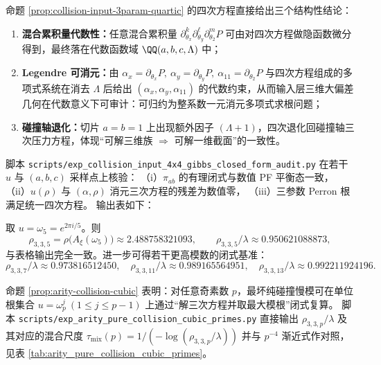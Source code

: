 \begin{remark}\label{rem:collision-input-3param-corollaries}
命题 \ref{prop:collision-input-3param-quartic} 的四次方程直接给出三个结构性结论：
\begin{enumerate}
  \item \textbf{混合累积量代数性：}任意混合累积量 \(\partial_{\theta_x}^{k}\partial_{\theta_y}^{\ell}\partial_{\theta_2}^{m}P\) 可由对四次方程做隐函数微分得到，最终落在代数函数域 \(\QQ(a,b,c,\Lambda)\) 中；
  \item \textbf{Legendre 可消元：}由 \(\alpha_x=\partial_{\theta_x}P,\ \alpha_y=\partial_{\theta_y}P,\ \alpha_{11}=\partial_{\theta_2}P\) 与四次方程组成的多项式系统在消去 \(\Lambda\) 后给出 \((\alpha_x,\alpha_y,\alpha_{11})\) 的代数约束，从而输入层三维大偏差几何在代数意义下可审计：可归约为整系数一元消元多项式求根问题；
  \item \textbf{碰撞轴退化：}切片 \(a=b=1\) 上出现额外因子 \((\Lambda+1)\)，四次退化回碰撞轴三次压力方程，体现“可解三维族 \(\Rightarrow\) 可解一维截面”的一致性。
\end{enumerate}
\end{remark}

\begin{remark}\label{rem:collision-input-4x4-gibbs-audit}
脚本 \texttt{scripts/exp\_collision\_input\_4x4\_gibbs\_closed\_form\_audit.py} 在若干 \(u\) 与 \((a,b,c)\) 采样点上核验：
（i）\(\pi_{ab}\) 的有理闭式与数值 PF 平衡态一致，
（ii）\(u(\rho)\) 与 \((\alpha,\rho)\) 消元三次方程的残差为数值零，
（iii）三参数 Perron 根满足统一四次方程。
输出表如下：

\end{remark}

\begin{remark}\label{cor:arity-335-rho-closed-form}
取 \(u=\omega_5=e^{2\pi i/5}\)。则
$$
\rho_{3,3,5}=\rho\bigl(A_\xi(\omega_5)\bigr)\approx 2.488758321093,
\qquad
\rho_{3,3,5}/\lambda\approx 0.950621088873,
$$
与表格输出完全一致。进一步可得若干更高模数的闭式基准：
$$
\rho_{3,3,7}/\lambda\approx 0.973816512450,\quad
\rho_{3,3,11}/\lambda\approx 0.989165564951,\quad
\rho_{3,3,13}/\lambda\approx 0.992211924196.
$$
\end{remark}

\begin{remark}\label{rem:arity-collision-cubic-primes-table}
命题 \ref{prop:arity-collision-cubic} 表明：对任意奇素数 \(p\)，最坏纯碰撞慢模可在单位根集合 \(u=\omega_p^j\ (1\le j\le p-1)\) 上通过“解三次方程并取最大模根”闭式复算。
脚本 \texttt{scripts/exp\_arity\_pure\_collision\_cubic\_primes.py} 直接输出
\(
\rho_{3,3,p}/\lambda
\)
及其对应的混合尺度
\(
\tau_{\mathrm{mix}}(p)=1/(-\log(\rho_{3,3,p}/\lambda))
\)
并与 \(p^{-4}\) 渐近式作对照，见表 \ref{tab:arity_pure_collision_cubic_primes}。
\end{remark}


